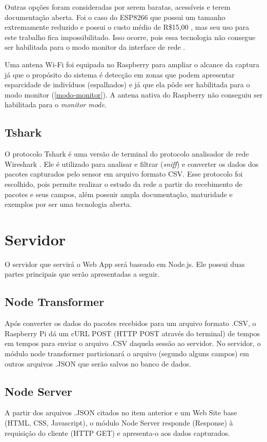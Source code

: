 Outras opções foram consideradas por serem baratas, acessíveis e terem documentação aberta. Foi o caso do ESP8266 que possui um tamanho extremamente
reduzido e possui o custo médio de R\$15,00 \cite{Embarcados2015}, mas seu uso para este trabalho fica impossibilitado. Isso
ocorre, pois essa tecnologia não consegue ser habilitada para o modo monitor da interface de rede \cite{Puhl2016} \cite{Ferreira2016}.

Uma antena Wi-Fi foi equipada no Raspberry para ampliar o alcance da captura já que o propósito do sistema é detecção em zonas que podem
apresentar esparcidade de indivíduos (espalhados) e já que ela pôde ser habilitada para o modo monitor (\autoref{modo-monitor}). A antena nativa 
do Raspberry não conseguiu ser habilitada para o \emph{monitor mode}.

\subsection{Tshark}

O protocolo Tshark é uma versão de terminal do protocolo
analisador de rede Wireshark \cite{Wireshark2017} \cite{Wireshark2017a}. Ele é utilizado para analisar e filtrar (\emph{sniff}) e converter os dados dos pacotes capturados pelo sensor em arquivo formato CSV. Esse protocolo foi escolhido, pois permite realizar o estudo da rede a partir do recebimento de pacotes e seus campos, além possuir ampla documentação, maturidade e exemplos por ser uma tecnologia aberta.

\section{Servidor}
O servidor que servirá o Web App será baseado em Node.js. Ele possui duas partes principais que serão apresentadas a seguir.

\subsection{Node Transformer}
Após converter os dados do pacotes recebidos para um arquivo formato .CSV, o Raspberry Pi dá um cURL POST (HTTP POST através do terminal) de tempos em tempos para enviar o arquivo .CSV daquela sessão ao servidor. No servidor, o módulo node transformer particionará o arquivo (segundo alguns campos) em outros arquivos .JSON que serão salvos no banco de dados.

\subsection{Node Server}
 A partir dos arquivos .JSON citados no item anterior e um Web Site base (HTML, CSS, Javascript), o módulo Node Server responde (Response) à requisição do cliente (HTTP GET) e apresenta-o aos dados capturados.


